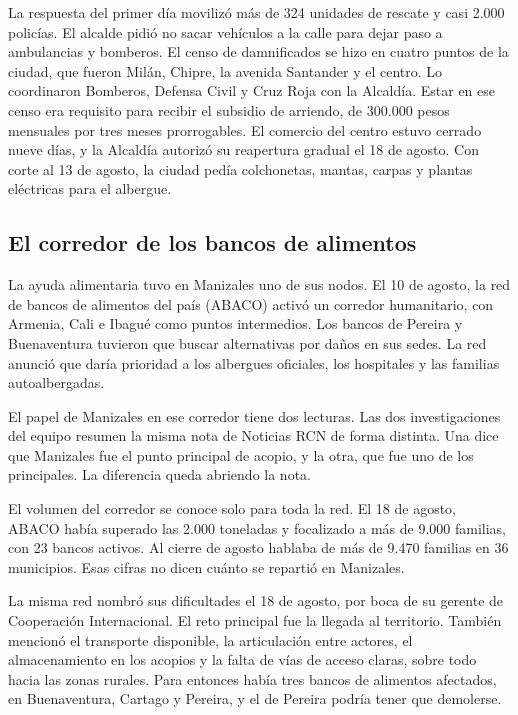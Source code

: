 La respuesta del primer día movilizó más de 324 unidades de rescate y casi 2.000 policías. El alcalde pidió no sacar vehículos a la calle para dejar paso a ambulancias y bomberos. El censo de damnificados se hizo en cuatro puntos de la ciudad, que fueron Milán, Chipre, la avenida Santander y el centro. Lo coordinaron Bomberos, Defensa Civil y Cruz Roja con la Alcaldía. Estar en ese censo era requisito para recibir el subsidio de arriendo, de 300.000 pesos mensuales por tres meses prorrogables. El comercio del centro estuvo cerrado nueve días, y la Alcaldía autorizó su reapertura gradual el 18 de agosto. Con corte al 13 de agosto, la ciudad pedía colchonetas, mantas, carpas y plantas eléctricas para el albergue.

\subsection{El corredor de los bancos de alimentos}

La ayuda alimentaria tuvo en Manizales uno de sus nodos. El 10 de agosto, la red de bancos de alimentos del país (ABACO) activó un corredor humanitario, con Armenia, Cali e Ibagué como puntos intermedios. Los bancos de Pereira y Buenaventura tuvieron que buscar alternativas por daños en sus sedes. La red anunció que daría prioridad a los albergues oficiales, los hospitales y las familias autoalbergadas.

El papel de Manizales en ese corredor tiene dos lecturas. Las dos investigaciones del equipo resumen la misma nota de Noticias RCN de forma distinta. Una dice que Manizales fue el punto principal de acopio, y la otra, que fue uno de los principales. La diferencia queda \porverificar{} abriendo la nota.

El volumen del corredor se conoce solo para toda la red. El 18 de agosto, ABACO había superado las 2.000 toneladas y focalizado a más de 9.000 familias, con 23 bancos activos. Al cierre de agosto hablaba de más de 9.470 familias en 36 municipios. Esas cifras no dicen cuánto se repartió en Manizales.

La misma red nombró sus dificultades el 18 de agosto, por boca de su gerente de Cooperación Internacional. El reto principal fue la llegada al territorio. También mencionó el transporte disponible, la articulación entre actores, el almacenamiento en los acopios y la falta de vías de acceso claras, sobre todo hacia las zonas rurales. Para entonces había tres bancos de alimentos afectados, en Buenaventura, Cartago y Pereira, y el de Pereira podría tener que demolerse.

